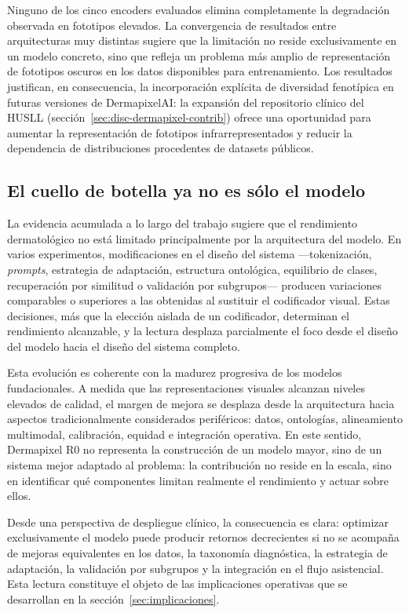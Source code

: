 Ninguno de los cinco encoders evaluados elimina completamente la
degradación observada en fototipos elevados. La convergencia de
resultados entre arquitecturas muy distintas sugiere que la limitación
no reside exclusivamente en un modelo concreto, sino que refleja un
problema más amplio de representación de fototipos oscuros en los datos
disponibles para entrenamiento. Los resultados justifican, en
consecuencia, la incorporación explícita de diversidad fenotípica en
futuras versiones de DermapixelAI: la expansión del repositorio clínico
del HUSLL (sección~\ref{sec:disc-dermapixel-contrib}) ofrece una
oportunidad para aumentar la representación de fototipos
infrarrepresentados y reducir la dependencia de distribuciones
procedentes de datasets públicos.

\subsection{El cuello de botella ya no es sólo el modelo}
\label{sec:disc-cuello-botella}

La evidencia acumulada a lo largo del trabajo sugiere que el rendimiento
dermatológico no está limitado principalmente por la arquitectura del
modelo. En varios experimentos, modificaciones en el diseño del sistema
---tokenización, \emph{prompts}, estrategia de adaptación, estructura
ontológica, equilibrio de clases, recuperación por similitud o
validación por subgrupos--- producen variaciones comparables o
superiores a las obtenidas al sustituir el codificador visual. Estas
decisiones, más que la elección aislada de un codificador, determinan el
rendimiento alcanzable, y la lectura desplaza parcialmente el foco desde
el diseño del modelo hacia el diseño del sistema completo.

Esta evolución es coherente con la madurez progresiva de los modelos
fundacionales. A medida que las representaciones visuales alcanzan
niveles elevados de calidad, el margen de mejora se desplaza desde la
arquitectura hacia aspectos tradicionalmente considerados periféricos:
datos, ontologías, alineamiento multimodal, calibración, equidad e
integración operativa. En este sentido, Dermapixel R0 no representa la
construcción de un modelo mayor, sino de un sistema mejor adaptado al
problema: la contribución no reside en la escala, sino en identificar
qué componentes limitan realmente el rendimiento y actuar sobre ellos.

Desde una perspectiva de despliegue clínico, la consecuencia es clara:
optimizar exclusivamente el modelo puede producir retornos decrecientes
si no se acompaña de mejoras equivalentes en los datos, la taxonomía
diagnóstica, la estrategia de adaptación, la validación por subgrupos y
la integración en el flujo asistencial. Esta lectura constituye el
objeto de las implicaciones operativas que se desarrollan en la
sección~\ref{sec:implicaciones}.

